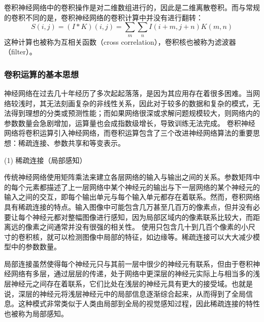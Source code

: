 卷积神经网络中的卷积操作是对二维数组进行的，因此是二维离散卷积。而与常规的卷积不同的是，卷积神经网络的卷积计算中并没有进行翻转：
%
\begin{equation}
S(i,j) = (I*K)(i,j) = \sum\limits_{m} \sum\limits_{n} I(i+m,j+n)K(m,n)
\end{equation}
这种计算也被称为互相关函数（cross correlation），卷积核也被称为滤波器（filter）。

\subsubsection{卷积运算的基本思想}
神经网络在过去几十年经历了多次起起落落，是因为其应用存在着很多困难。当网络较浅时，其无法刻画复杂的非线性关系，因此对于较多的数据和复杂的模式，无法得到理想的分类或预测性能；而如果网络很深或求解问题规模较大，则网络内的参数数量会急剧增加，运算量也会成指数级增长，导致训练无法完成。
卷积神经网络将卷积运算引入神经网络，而卷积运算包含了三个改进神经网络算法的重要思想：稀疏连接、参数共享和等变表示。

(1) 稀疏连接（局部感知）

传统神经网络使用矩阵乘法来建立各层网络的输入与输出之间的关系。参数矩阵中的每个元素都描述了上一层网络中某个神经元的输出与下一层网络的某个神经元的输入之间的交互，即每个输出单元与每个输入单元都存在着联系。然而，卷积网络具有稀疏连接的特点。输入图像中可能包含几万甚至几百万的像素点，但并没有必要让每个神经元都对整幅图像进行感知，因为局部区域内的像素联系比较大，而距离远的像素之间通常并没有很强的相关性。
使用只包含几十到几百个像素的小尺寸的卷积核，就可以检测图像中局部的特征，如边缘等。稀疏连接可以大大减少模型中的参数数量。

局部连接虽然使得每个神经元只与其前一层中很少的神经元有联系，但由于卷积神经网络有多层，通过层层的传递，处于网络中更深层的神经元实际上与相当多的浅层神经元之间存在着联系，它们比处在浅层的神经元具有更大的接受域。也就是说，深层的神经元将浅层神经元中的局部信息逐渐综合起来，从而得到了全局信息。这种模式非常类似于人类由局部到全局的视觉感知过程，因此稀疏连接的特性也被称为局部感知。

